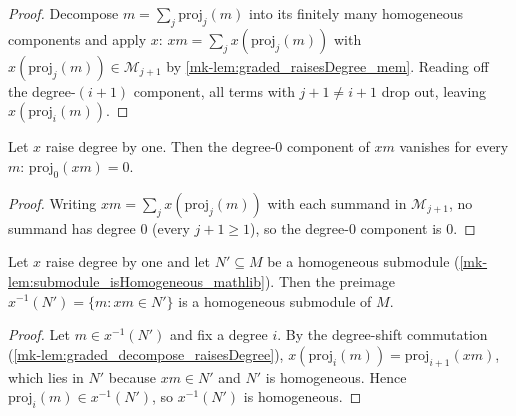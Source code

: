 \begin{proof}
  \leanok
  Decompose \(m = \sum_j \mathrm{proj}_j(m)\) into its finitely many homogeneous
  components and apply \(x\): \(x m = \sum_j x(\mathrm{proj}_j(m))\) with
  \(x(\mathrm{proj}_j(m)) \in \mathcal{M}_{j+1}\) by
  \ref{mk-lem:graded_raisesDegree_mem}. Reading off the degree-\((i+1)\) component, all
  terms with \(j+1 \ne i+1\) drop out, leaving \(x(\mathrm{proj}_i(m))\).
\end{proof}

\begin{lemma}\label{mk-lem:graded_decompose_raisesDegree_zero}
  \leanok

  Let \(x\) raise degree by one. Then the degree-\(0\) component of \(x m\) vanishes
  for every \(m\): \(\mathrm{proj}_0(x m) = 0\).
\end{lemma}

\begin{proof}
  \leanok
  Writing \(x m = \sum_j x(\mathrm{proj}_j(m))\) with each summand in
  \(\mathcal{M}_{j+1}\), no summand has degree \(0\) (every \(j+1 \ge 1\)), so the
  degree-\(0\) component is \(0\).
\end{proof}

\begin{lemma}\label{mk-lem:graded_comap_isHomogeneous}
  \leanok

  Let \(x\) raise degree by one and let \(N' \subseteq M\) be a homogeneous submodule
  (\ref{mk-lem:submodule_isHomogeneous_mathlib}). Then the preimage \(x^{-1}(N') =
  \{m : x m \in N'\}\) is a homogeneous submodule of \(M\).
\end{lemma}

\begin{proof}
  \leanok
  Let \(m \in x^{-1}(N')\) and fix a degree \(i\). By the degree-shift commutation
  (\ref{mk-lem:graded_decompose_raisesDegree}), \(x(\mathrm{proj}_i(m)) =
  \mathrm{proj}_{i+1}(x m)\), which lies in \(N'\) because \(x m \in N'\) and \(N'\)
  is homogeneous. Hence \(\mathrm{proj}_i(m) \in x^{-1}(N')\), so \(x^{-1}(N')\) is
  homogeneous.
\end{proof}

